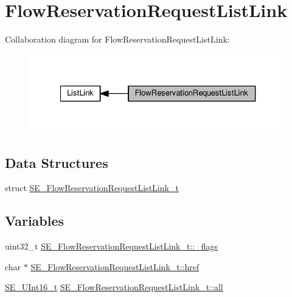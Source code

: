 \hypertarget{group__FlowReservationRequestListLink}{}\section{Flow\+Reservation\+Request\+List\+Link}
\label{group__FlowReservationRequestListLink}
Collaboration diagram for Flow\+Reservation\+Request\+List\+Link\+:\nopagebreak
\begin{figure}[H]
\begin{center}
\leavevmode
\includegraphics[width=327pt]{group__FlowReservationRequestListLink}
\end{center}
\end{figure}
\subsection*{Data Structures}
\begin{DoxyCompactItemize}
\item 
struct \hyperlink{structSE__FlowReservationRequestListLink__t}{S\+E\+\_\+\+Flow\+Reservation\+Request\+List\+Link\+\_\+t}
\end{DoxyCompactItemize}
\subsection*{Variables}
\begin{DoxyCompactItemize}
\item 
uint32\+\_\+t \hyperlink{group__FlowReservationRequestListLink_ga303689b2785c25ec6c107fcc7d1a6a8f}{S\+E\+\_\+\+Flow\+Reservation\+Request\+List\+Link\+\_\+t\+::\+\_\+flags}
\item 
char $\ast$ \hyperlink{group__FlowReservationRequestListLink_ga1d73c03e68dab44c79e396b96b4fdd6a}{S\+E\+\_\+\+Flow\+Reservation\+Request\+List\+Link\+\_\+t\+::href}
\item 
\hyperlink{group__UInt16_gac68d541f189538bfd30cfaa712d20d29}{S\+E\+\_\+\+U\+Int16\+\_\+t} \hyperlink{group__FlowReservationRequestListLink_ga0db45858843bf00feee2e60960b642dd}{S\+E\+\_\+\+Flow\+Reservation\+Request\+List\+Link\+\_\+t\+::all}
\end{DoxyCompactItemize}


